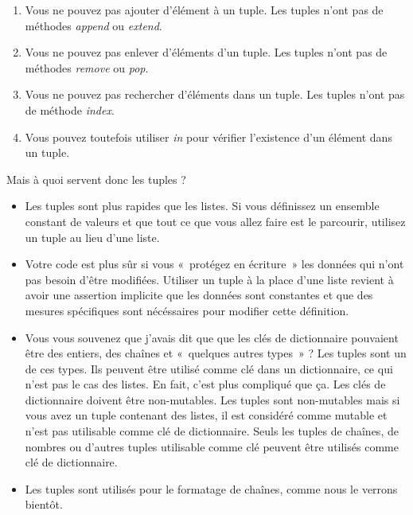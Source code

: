 \begin{enumerate}
\item{Vous ne pouvez pas ajouter d'élément à un tuple. Les tuples n'ont pas de méthodes \emph{append} ou \emph{extend}.}
\item{Vous ne pouvez pas enlever d'éléments d'un tuple. Les tuples n'ont pas de méthodes \emph{remove} ou \emph{pop}.}
\item{Vous ne pouvez pas rechercher d'éléments dans un tuple. Les tuples n'ont pas de méthode \emph{index}.}
\item{Vous pouvez toutefois utiliser \emph{in} pour vérifier l'existence d'un élément dans un tuple.}
\end{enumerate}

Mais à quoi servent donc les tuples ?

\begin{itemize}
\item {Les tuples sont plus rapides que les listes. Si vous définissez un ensemble constant de valeurs et que tout ce que vous allez faire est le parcourir, utilisez un tuple au lieu d'une liste.}
\item {Votre code est plus sûr si vous «~protégez en écriture~» les données qui n'ont pas besoin d'être modifiées. Utiliser un tuple à la place d'une liste revient à avoir une assertion implicite que les données sont constantes et que des mesures spécifiques sont nécéssaires pour modifier cette définition.}
\item{Vous vous souvenez que j'avais dit que que les clés de dictionnaire pouvaient être des entiers, des chaînes et «~quelques autres types~» ? Les tuples sont un de ces types. Ils peuvent être utilisé comme clé dans un dictionnaire, ce qui n'est pas le cas des listes. En fait, c'est plus compliqué que ça. Les clés de dictionnaire doivent être non-mutables. Les tuples sont non-mutables mais si vous avez un tuple contenant des listes, il est considéré comme mutable et n'est pas utilisable comme clé de dictionnaire. Seuls les tuples de chaînes, de nombres ou d'autres tuples utilisable comme clé peuvent être utilisés comme clé de dictionnaire.}
\item{Les tuples sont utilisés pour le formatage de chaînes, comme nous le verrons bientôt.}
\end{itemize}



